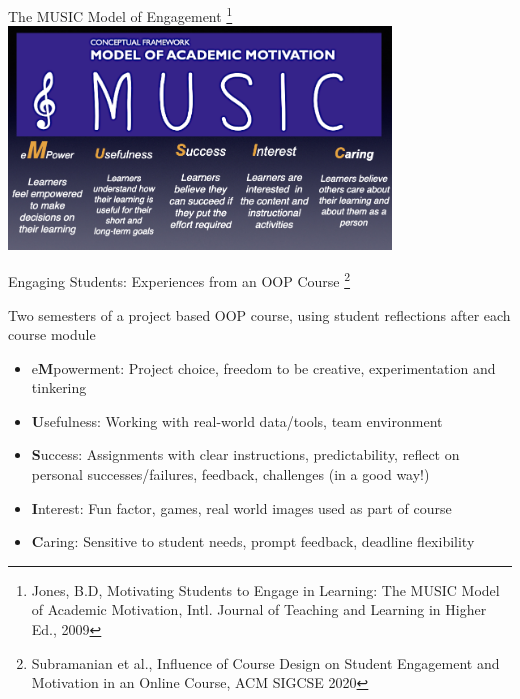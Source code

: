 \documentclass[aspectratio=169]{beamer}
\begin{document}
\begin{frame}{The MUSIC Model of Engagement}
\footnote{ Jones, B.D, Motivating Students to Engage in Learning: The MUSIC Model of Academic Motivation, Intl. Journal of Teaching and Learning in Higher Ed., 2009}
\centering\includegraphics[width=4in]{figs/music_model.png}
\end{frame}
\begin{frame}{Engaging Students: Experiences from an OOP Course
\footnote{Subramanian et al., Influence of Course Design on Student Engagement and Motivation in an Online Course, ACM SIGCSE 2020}}
\begin{block}{Two semesters of a project based OOP course, using
student  reflections after each course module}
\end{block}
\begin{itemize} 
	\item e\textbf{M}powerment: Project choice, freedom to be creative, 
		experimentation and tinkering
	\item \textbf{U}sefulness: Working with real-world data/tools, team
		environment
	\item \textbf{S}uccess: Assignments with clear instructions, predictability,
		reflect on personal successes/failures, feedback, challenges (in a good way!)
	\item \textbf{I}nterest: Fun factor,  games, real world images used
		as part of course
	\item \textbf{C}aring: Sensitive to student needs, prompt feedback, deadline
		flexibility
\end{itemize}
\end{frame}
\end{document}
